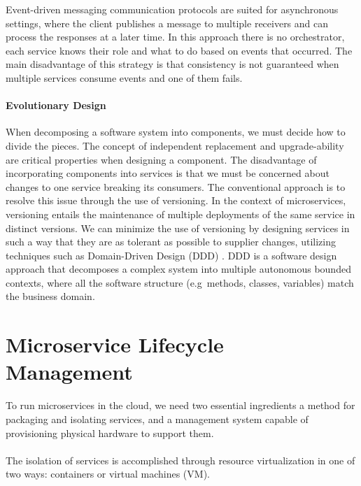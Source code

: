 Event-driven messaging communication protocols are suited for asynchronous settings,
where the client publishes a message to multiple receivers and can process the responses at a later time.
In this approach there is no orchestrator, each service knows their role and what to do based on events that occurred.
The main disadvantage of this strategy is that consistency is not guaranteed when multiple services consume events and one of them fails.

\paragraph{Evolutionary Design}
When decomposing a software system into components, we must decide how to divide the pieces.
The concept of independent replacement and upgrade-ability are critical properties when designing a component.
The disadvantage of incorporating components into services is that we must be concerned about changes to one service breaking its consumers.
The conventional approach is to resolve this issue through the use of versioning.
In the context of microservices, versioning entails the maintenance of multiple deployments of the same service in distinct versions.
We can minimize the use of versioning by designing services in such a way that they are as tolerant as possible to supplier changes,
utilizing techniques such as Domain-Driven Design (DDD) \cite{ddd}.
DDD is a software design approach that decomposes a complex system into multiple autonomous bounded contexts,
where all the software structure (e.g\ methods, classes, variables) match the business domain.

\section{Microservice Lifecycle Management} %
\label{sec:microservice_lifecycle_management}

To run microservices in the cloud, we need two essential ingredients a method for packaging and isolating services,
and a management system capable of provisioning physical hardware to support them.

\paragraph{}

The isolation of services is accomplished through resource virtualization in one of two ways: containers or virtual machines (VM).

